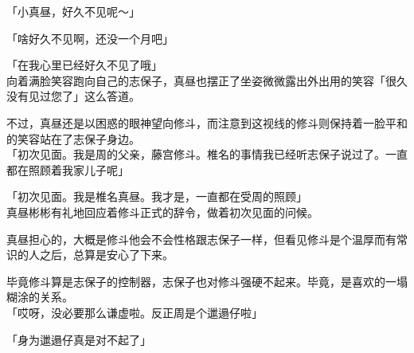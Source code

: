 「小真昼，好久不见呢～」

「啥好久不见啊，还没一个月吧」

「在我心里已经好久不见了哦」\\

向着满脸笑容跑向自己的志保子，真昼也摆正了坐姿微微露出外出用的笑容「很久没有见过您了」这么答道。

不过，真昼还是以困惑的眼神望向修斗，而注意到这视线的修斗则保持着一脸平和的笑容站在了志保子身边。\\

「初次见面。我是周的父亲，藤宫修斗。椎名的事情我已经听志保子说过了。一直都在照顾着我家儿子呢」

「初次见面。我是椎名真昼。我才是，一直都在受周的照顾」\\

真昼彬彬有礼地回应着修斗正式的辞令，做着初次见面的问候。

真昼担心的，大概是修斗他会不会性格跟志保子一样，但看见修斗是个温厚而有常识的人之后，总算是安心了下来。

毕竟修斗算是志保子的控制器，志保子也对修斗强硬不起来。毕竟，是喜欢的一塌糊涂的关系。\\

「哎呀，没必要那么谦虚啦。反正周是个邋遢仔啦」

「身为邋遢仔真是对不起了」

